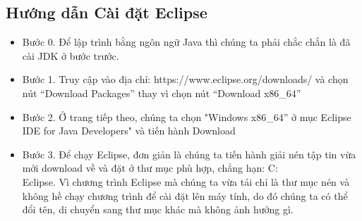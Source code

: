 \subsection{Hướng dẫn Cài đặt Eclipse}
\begin{itemize}
\item Bước 0. Để lập trình bằng ngôn ngữ Java thì chúng ta phải chắc chắn là đã cài JDK ở bước trước.
\item Bước 1. Truy cập vào địa chỉ: https://www.eclipse.org/downloads/ và chọn nút “Download Packages” thay vì chọn nút “Download x86\_64” 
\item Bước 2. Ở trang tiếp theo, chúng ta chọn "Windows x86\_64” ở mục Eclipse IDE for Java Developers" và tiến hành Download
\item Bước 3. Để chạy Eclipse, đơn giản là chúng ta tiến hành giải nén tập tin vừa mới download về và đặt ở thư mục phù hợp, chẳng hạn: C:\\Eclipse. Vì chương trình Eclipse mà chúng ta vừa tải chỉ là thư mục nén và không hề chạy chương trình để cài đặt lên máy tính, do đó chúng ta có thể đổi tên, di chuyển sang thư mục khác mà không ảnh hưởng gì.
\end{itemize}
